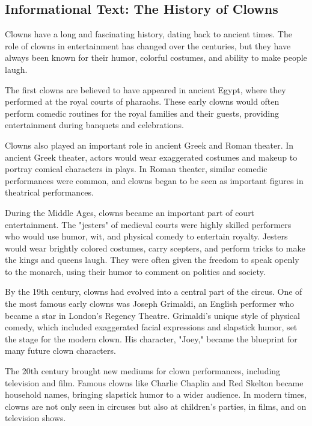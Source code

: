 \documentclass[12pt]{article}
\begin{document}
\onehalfspacing

\subsection*{Informational Text: The History of Clowns}

\begin{tcolorbox}[colframe=black!40, colback=gray!5]

\begin{spacing}{1.15}

Clowns have a long and fascinating history, dating back to ancient times. The role of clowns in entertainment has changed over the centuries, but they have always been known for their humor, colorful costumes, and ability to make people laugh. 

The first clowns are believed to have appeared in ancient Egypt, where they performed at the royal courts of pharaohs. These early clowns would often perform comedic routines for the royal families and their guests, providing entertainment during banquets and celebrations.

Clowns also played an important role in ancient Greek and Roman theater. In ancient Greek theater, actors would wear exaggerated costumes and makeup to portray comical characters in plays. In Roman theater, similar comedic performances were common, and clowns began to be seen as important figures in theatrical performances.

During the Middle Ages, clowns became an important part of court entertainment. The "jesters" of medieval courts were highly skilled performers who would use humor, wit, and physical comedy to entertain royalty. Jesters would wear brightly colored costumes, carry scepters, and perform tricks to make the kings and queens laugh. They were often given the freedom to speak openly to the monarch, using their humor to comment on politics and society.

By the 19th century, clowns had evolved into a central part of the circus. One of the most famous early clowns was Joseph Grimaldi, an English performer who became a star in London’s Regency Theatre. Grimaldi's unique style of physical comedy, which included exaggerated facial expressions and slapstick humor, set the stage for the modern clown. His character, "Joey," became the blueprint for many future clown characters.

The 20th century brought new mediums for clown performances, including television and film. Famous clowns like Charlie Chaplin and Red Skelton became household names, bringing slapstick humor to a wider audience. In modern times, clowns are not only seen in circuses but also at children's parties, in films, and on television shows.


\end{spacing}
\end{tcolorbox}
\end{document}
